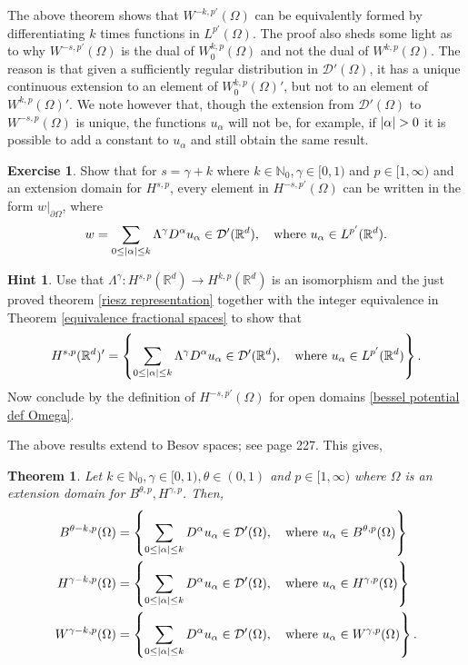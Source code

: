 \documentclass[
    a4paper,
    DIV=14,
    abstract=true,
    numbers=noenddot
]
{scrartcl}
\newtheorem{theorem}{Theorem}[section]
\theoremstyle{definition}
\newtheorem{exercise}{Exercise}
\newtheorem*{hint}{Hint}
\newcommand{\set}[1]{\left\{#1\right\}}
\newcommand\restr[2]{\left.#1\right|_{#2}}
\newcommand{\N}{\mathbb{N}}
\newcommand{\R}{\mathbb{R}}
\newcommand{\Dd}{\mathcal{D}}
\begin{document}
The above theorem shows that $W^{-k,p'}(\Omega )$ can be equivalently formed by differentiating $k$ times functions in $L^{p'}(\Omega )$. The proof also sheds some light as to why $W^{-s,p'}(\Omega )$ is the dual of $W^{k,p}_0(\Omega )$ and not the dual of $W^{k,p}(\Omega )$. The reason is that given a sufficiently regular distribution in $\Dd'(\Omega )$, it has a unique continuous extension to an element of $W_0^{k,p}(\Omega )'$, but not to an element of $W^{k,p}(\Omega )'$. We note however that, though the extension from $\Dd'(\Omega )$ to $W^{-s,p}(\Omega )$ is unique, the functions $u_\alpha$ will not be, for example, if $\abs{\alpha}>0$ it is possible to add a constant to $u_\alpha$ and still obtain the same result.
\begin{exercise}
    Show that for $s= \gamma +k$ where $k \in \N_0, \gamma \in [0,1)$  and $p \in [1,\infty)$ and an extension domain for $H^{s,p}$,    every element in $H^{-s,p'}(\Omega )$ can be written in the form $\restr{w}{\partial \Omega }$, where
    \begin{align*}
        w=\sum_{0\leq\abs{\alpha}\leq k} \Lambda^{\gamma } D^\alpha u_\alpha\in \Dd'(\R^d ),\quad \text{where }    u_\alpha \in L^{p'}(\R^d ).
    \end{align*}
\end{exercise}
\begin{hint}
    Use that $\Lambda ^{\gamma }: H^{s,p}(\R^d) \to H^{k ,p}(\R^d)$ is an isomorphism and the just proved theorem \ref{riesz representation} together with the integer equivalence in Theorem \ref{equivalence fractional spaces} to show that
    \begin{align*}
        H^{s,p}(\R^d)' = \set{ \sum_{0\leq\abs{\alpha}\leq k} \Lambda^{\gamma } D^\alpha u_\alpha\in \Dd'(\R^d ),\quad \text{where }    u_\alpha \in L^{p'}(\R^d )}.
    \end{align*}
    Now conclude by the definition of $H^{-s,p'}(\Omega )$ for open domains \ref{bessel potential def Omega}.
\end{hint}
The above results extend to Besov spaces; see \cite{agranovich2015sobolev} page 227. This gives,
\begin{theorem}
    Let  $k \in \N_0, \gamma \in [0,1), \theta \in (0,1)$ and $p \in [1,\infty)$ where $\Omega$ is an extension domain for $B^{\theta   ,p}, H^{\gamma ,p}$. Then,
    \begin{align*}
        B^{\theta  -k,p}(\Omega ) & = \set{ \sum_{0\leq\abs{\alpha}\leq k} D^\alpha u_\alpha\in \Dd'(\Omega ),\quad \text{where }    u_\alpha \in B^{\theta  ,p}(\Omega )} \\
        H^{\gamma -k,p}(\Omega )  & = \set{ \sum_{0\leq\abs{\alpha}\leq k} D^\alpha u_\alpha\in \Dd'(\Omega ),\quad \text{where }    u_\alpha \in H^{\gamma ,p}(\Omega )}  \\
        W^{\gamma -k,p}(\Omega )  & = \set{ \sum_{0\leq\abs{\alpha}\leq k} D^\alpha u_\alpha\in \Dd'(\Omega ),\quad \text{where }    u_\alpha \in W^{\gamma ,p}(\Omega )}.
    \end{align*}
\end{theorem}
\end{document}
